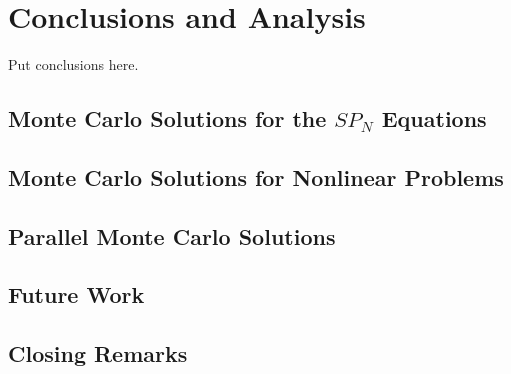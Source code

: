 \chapter{Conclusions and Analysis}
\label{ch:conclusion}
Put conclusions here.

\section{Monte Carlo Solutions for the $SP_N$ Equations}
\label{sec:spn_conclusion}

\section{Monte Carlo Solutions for Nonlinear Problems}
\label{sec:nonlinear_conclusions}

\section{Parallel Monte Carlo Solutions}
\label{sec:parallel_mc_conclusions}

\section{Future Work}
\label{sec:future_work}

\section{Closing Remarks}
\label{sec:closing}
